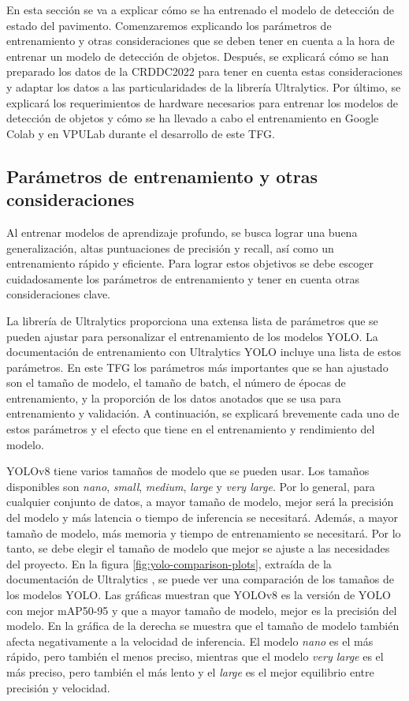 En esta sección se va a explicar cómo se ha entrenado el modelo de detección de estado del pavimento. Comenzaremos explicando los parámetros de entrenamiento y otras consideraciones que se deben tener en cuenta a la hora de entrenar un modelo de detección de objetos. Después, se explicará cómo se han preparado los datos de la CRDDC2022 para tener en cuenta estas consideraciones y adaptar los datos a las particularidades de la librería Ultralytics. Por último, se explicará los requerimientos de hardware necesarios para entrenar los modelos de detección de objetos y cómo se ha llevado a cabo el entrenamiento en Google Colab y en VPULab durante el desarrollo de este TFG.

\subsection{Parámetros de entrenamiento y otras consideraciones}
Al entrenar modelos de aprendizaje profundo, se busca lograr una buena generalización, altas puntuaciones de precisión y recall, así como un entrenamiento rápido y eficiente. Para lograr estos objetivos se debe escoger cuidadosamente los parámetros de entrenamiento y tener en cuenta otras consideraciones clave.

La librería de Ultralytics proporciona una extensa lista de parámetros que se pueden ajustar para personalizar el entrenamiento de los modelos YOLO. La documentación de entrenamiento con Ultralytics YOLO \cite{ultralytics_train} incluye una lista de estos parámetros. En este TFG los parámetros más importantes que se han ajustado son el tamaño de modelo, el tamaño de batch, el número de épocas de entrenamiento, y la proporción de los datos anotados que se usa para entrenamiento y validación. A continuación, se explicará brevemente cada uno de estos parámetros y el efecto que tiene en el entrenamiento y rendimiento del modelo.

YOLOv8 tiene varios tamaños de modelo que se pueden usar. Los tamaños disponibles son \textit{nano}, \textit{small}, \textit{medium}, \textit{large} y \textit{very large}. Por lo general, para cualquier conjunto de datos, a mayor tamaño de modelo, mejor será la precisión del modelo y más latencia o tiempo de inferencia se necesitará. Además, a mayor tamaño de modelo, más memoria y tiempo de entrenamiento se necesitará. Por lo tanto, se debe elegir el tamaño de modelo que mejor se ajuste a las necesidades del proyecto. En la figura \ref{fig:yolo-comparison-plots}, extraída de la documentación de Ultralytics \cite{yolov8_ultralytics}, se puede ver una comparación de los tamaños de los modelos YOLO. Las gráficas muestran que YOLOv8 es la versión de YOLO con mejor mAP50-95 y que a mayor tamaño de modelo, mejor es la precisión del modelo. En la gráfica de la derecha se muestra que el tamaño de modelo también afecta negativamente a la velocidad de inferencia. El modelo \textit{nano} es el más rápido, pero también el menos preciso, mientras que el modelo \textit{very large} es el más preciso, pero también el más lento y el \textit{large} es el mejor equilibrio entre precisión y velocidad.

